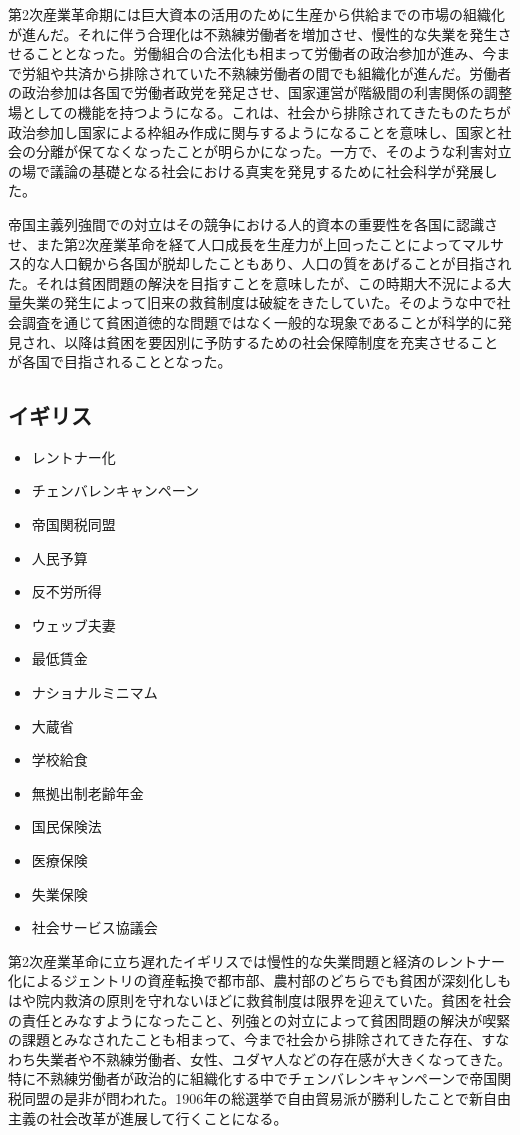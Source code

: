 \documentclass{jsarticle}
\begin{document}
第2次産業革命期には巨大資本の活用のために生産から供給までの市場の組織化が進んだ。それに伴う合理化は不熟練労働者を増加させ、慢性的な失業を発生させることとなった。労働組合の合法化も相まって労働者の政治参加が進み、今まで労組や共済から排除されていた不熟練労働者の間でも組織化が進んだ。労働者の政治参加は各国で労働者政党を発足させ、国家運営が階級間の利害関係の調整場としての機能を持つようになる。これは、社会から排除されてきたものたちが政治参加し国家による枠組み作成に関与するようになることを意味し、国家と社会の分離が保てなくなったことが明らかになった。一方で、そのような利害対立の場で議論の基礎となる社会における真実を発見するために社会科学が発展した。

帝国主義列強間での対立はその競争における人的資本の重要性を各国に認識させ、また第2次産業革命を経て人口成長を生産力が上回ったことによってマルサス的な人口観から各国が脱却したこともあり、人口の質をあげることが目指された。それは貧困問題の解決を目指すことを意味したが、この時期大不況による大量失業の発生によって旧来の救貧制度は破綻をきたしていた。そのような中で社会調査を通じて貧困道徳的な問題ではなく一般的な現象であることが科学的に発見され、以降は貧困を要因別に予防するための社会保障制度を充実させることが各国で目指されることとなった。

\subsection{イギリス}
\begin{itemize}
	\item レントナー化
	\item チェンバレンキャンペーン
	\item 帝国関税同盟
	\item 人民予算
	\item 反不労所得
	\item ウェッブ夫妻
	\item 最低賃金
	\item ナショナルミニマム
	\item 大蔵省
	\item 学校給食
	\item 無拠出制老齢年金
	\item 国民保険法
	\item 医療保険
	\item 失業保険
	\item 社会サービス協議会
\end{itemize}

第2次産業革命に立ち遅れたイギリスでは慢性的な失業問題と経済のレントナー化によるジェントリの資産転換で都市部、農村部のどちらでも貧困が深刻化しもはや院内救済の原則を守れないほどに救貧制度は限界を迎えていた。貧困を社会の責任とみなすようになったこと、列強との対立によって貧困問題の解決が喫緊の課題とみなされたことも相まって、今まで社会から排除されてきた存在、すなわち失業者や不熟練労働者、女性、ユダヤ人などの存在感が大きくなってきた。特に不熟練労働者が政治的に組織化する中でチェンバレンキャンペーンで帝国関税同盟の是非が問われた。1906年の総選挙で自由貿易派が勝利したことで新自由主義の社会改革が進展して行くことになる。
\end{document}
